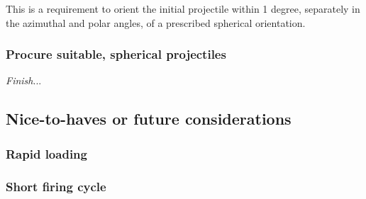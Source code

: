\documentclass{article}
\begin{document}
This is a requirement to orient the initial projectile within 1 degree, separately in the
azimuthal and polar angles, of a prescribed spherical orientation.

\subsubsection{Procure suitable, spherical projectiles}
{\it Finish}...

\subsection{Nice-to-haves or future considerations}

\subsubsection{Rapid loading}

\subsubsection{Short firing cycle}




\end{document}
